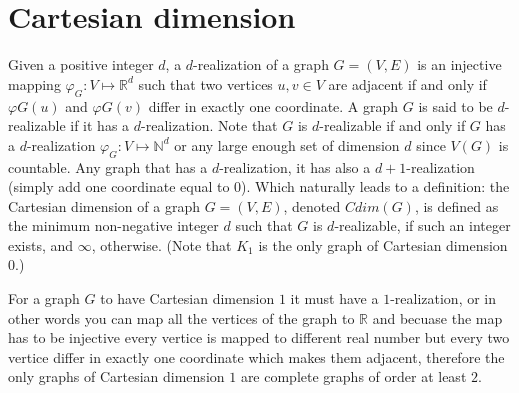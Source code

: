 \documentclass[12pt,a4paper,titlepage,openany]{report}
\begin{document}
\chapter{Cartesian dimension}
Given a positive integer $d$, a $d$-realization of a graph $G=(V,E)$ is an injective mapping $\varphi_G:V\mapsto \mathbb{R}^d$ such that two vertices $u, v \in V$ are adjacent if and only if $\varphi G(u)$ and $\varphi G(v)$ differ in exactly one coordinate. A graph $G$ is said to be $d$-realizable if it has a $d$-realization. Note that $G$ is $d$-realizable if and only if $G$ has a $d$-realization $\varphi_G : V \mapsto \mathbb{N}^d$ or any large enough set of dimension $d$ since $V(G)$ is countable.\newline
Any graph that has a $d$-realization, it has also a $d+1$-realization (simply add one coordinate equal to $0$). Which naturally leads to a definition: the Cartesian dimension of a graph $G = (V, E)$, denoted $Cdim(G)$, is defined as the minimum non-negative integer $d$ such that $G$ is $d$-realizable, if such an integer exists, and $\infty$, otherwise. (Note that $K_1$ is the only graph of Cartesian dimension 0.)\newline

For a graph $G$ to have Cartesian dimension $1$ it must have a $1$-realization, or in other words you can map all the vertices of the graph to $\mathbb{R}$ and becuase the map has to be injective every vertice is mapped to different real number but every two vertice differ in exactly one coordinate which makes them adjacent, therefore the only graphs of Cartesian dimension $1$ are complete graphs of order at least $2$.
\end{document}
